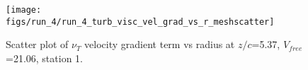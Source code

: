 \begin{figure}[H]
\centering
\texttt{[image: figs/run\_4/run\_4\_turb\_visc\_vel\_grad\_vs\_r\_meshscatter]}
\caption{Scatter plot of $\nu_T$ velocity gradient term vs radius at $z/c$=5.37, $V_{free}$=21.06, station 1.}
\label{fig:run_4_turb_visc_vel_grad_vs_r_meshscatter}
\end{figure}


